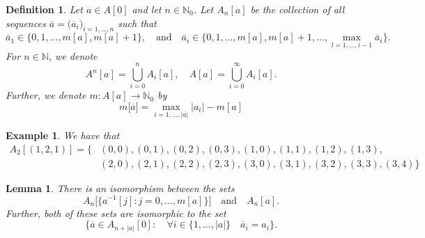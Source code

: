 \documentclass[a4paper,11pt,twoside]{article}
\numberwithin{equation}{section}
\theoremstyle{plain}
\newtheorem{lemma}[theorem]{Lemma}
\newtheorem{definition}[theorem]{Definition}
\newtheorem{example}[theorem]{Example}
\newcommand{\bN}{\mathbb{N}}
\newcommand{\1}{\mathbbm{1}}
\begin{document}
	\begin{definition}
		\label{definition:A_0^n-a}
		Let $a\in A[0]$ and let $n\in \bN_0$. Let $A_{n}[a]$ be the collection of all sequences $\overline{a} = \big( \overline{a}_i \big)_{i=1, ..., n}$ such that 
		$$
		\overline{a}_1 \in \big\{ 0, 1, ..., m[a], m[a] + 1 \big\}, \quad \mbox{and} \quad \overline{a}_i \in \Big\{ 0, 1, ..., m[a], m[a]+1, ..., \max_{l = 1, ..., i-1} \overline{a}_i \Big\}. 
		$$
		For $n\in \bN$, we denote
		$$
		A^n[a] = \bigcup_{i=0}^n A_i[a], \quad A[a] = \bigcup_{i=0}^{\infty} A_i[a]. 
		$$
		Further, we denote $m:A[a] \to \bN_0$ by
		$$
		m\big[ \overline{a} \big]=  \max_{i=1, ..., |\overline{a}| } |a_i| - m[a]
		$$
	\end{definition}
	
	\begin{example}
		We have that
		\begin{align*}
			A_{2}[(1,2,1)] = \Big\{& (0,0), (0,1), (0,2), (0,3), (1,0), (1,1), (1,2), (1,3), 
			\\
			& (2,0), (2,1), (2,2), (2,3), (3,0), (3,1), (3,2), (3,3), (3,4) \Big\}
		\end{align*}
	\end{example}
	
	\begin{lemma}
		\label{lemma:A_0^n-H(and)A_0^n-a}
		There is an isomorphism between the sets 
		$$
		A_n\big[ \{ a^{-1}[j]: j=0, ..., m[a] \} \big] \quad \mbox{and} \quad A_n[a]. 
		$$
		Further, both of these sets are isomorphic to the set
		$$
		\Big\{ \overline{a} \in A_{n+|a|}[0]: \quad \forall i\in \{1, ..., |a|\} \quad \overline{a}_i = a_i \Big\}. 
		$$
	\end{lemma}
	
\end{document}
